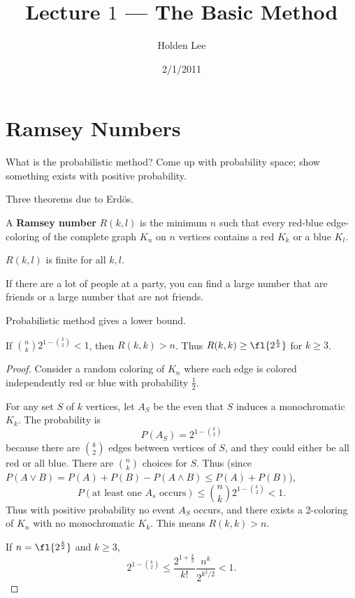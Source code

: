 
\pagestyle{fancy}





%
%

\title{Lecture $1$ --- The Basic Method}%
\author{Holden Lee}
\date{2/1/2011}%
\maketitle
\thispagestyle{empty}
\section{Ramsey Numbers}
What is the probabilistic method? Come up with probability space; show something exists with positive probability.

Three theorems due to Erd\"os.
\begin{df}
A \textbf{Ramsey number} $R(k,l)$ is the minimum $n$ such that every red-blue edge-coloring of the complete graph $K_n$ on $n$ vertices contains a red $K_k$ or a blue $K_l$. 
\end{df}

\begin{thm}
$R(k,l)$ is finite for all $k,l$.
\end{thm}
If there are a lot of people at a party, you can find a large number that are friends or a large number that are not friends.

Probabilistic method gives a lower bound.
\begin{pr}
If $\binom nk2^{1-\binom k2}<1$, then $R(k,k)>n$. Thus $R(k,k)\geq \fl{2^{\frac k2}}$ for $k\geq 3$.
\end{pr}
\begin{proof}
Consider a random coloring of $K_n$ where each edge is colored independently red or blue with probability $\frac 12$. 

For any set $S$ of $k$ vertices, let $A_S$ be the even that $S$ induces a monochromatic $K_k$. The probability is
\[P(A_S)=2^{1-\binom k2}\]
because there are $\binom k2$ edges between vertices of $S$, and they could either be all red or all blue. 
There are $\binom nk$ choices for $S$. Thus (since $P(A\vee B)=P(A)+P(B)-P(A\wedge B)\leq P(A)+P(B)$),
\[P(\text{at least one }A_s\text{ occurs})\leq \binom nk 2^{1-\binom k2}<1.\]
Thus with positive probability no event $A_S$ occurs, and there exists a 2-coloring of $K_n$ with no monochromatic $K_k$. This means $R(k,k)>n$. 

If $n=\fl{2^{\frac k2}}$ and $k\geq 3$,
\[2^{1-\binom k2}\leq \frac{2^{1+\frac k2}}{k!} \frac{n^k}{2^{k^2/2}}<1.\]
\end{proof}

